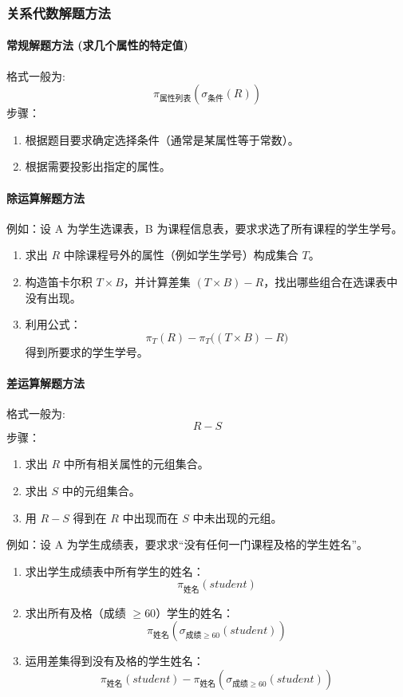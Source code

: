 \subsubsection{关系代数解题方法}

\paragraph{常规解题方法 (求几个属性的特定值)}
格式一般为:
\[
\pi_{\text{属性列表}}(\sigma_{\text{条件}}(R))
\]
步骤：
\begin{enumerate}
    \item 根据题目要求确定选择条件（通常是某属性等于常数）。
    \item 根据需要投影出指定的属性。
\end{enumerate}

\paragraph{除运算解题方法}
例如：设 A 为学生选课表，B 为课程信息表，要求求选了所有课程的学生学号。
\begin{enumerate}
    \item 求出 $R$ 中除课程号外的属性（例如学生学号）构成集合 $T$。
    \item 构造笛卡尔积 $T \times B$，并计算差集 $(T \times B) - R$，找出哪些组合在选课表中没有出现。
    \item 利用公式：
    \[
    \pi_T(R) - \pi_T\Big((T \times B) - R\Big)
    \]
    得到所要求的学生学号。
\end{enumerate}

\paragraph{差运算解题方法}
格式一般为:
\[
R - S
\]
步骤：
\begin{enumerate}
    \item 求出 $R$ 中所有相关属性的元组集合。
    \item 求出 $S$ 中的元组集合。
    \item 用 $R - S$ 得到在 $R$ 中出现而在 $S$ 中未出现的元组。
\end{enumerate}
例如：设 A 为学生成绩表，要求求“没有任何一门课程及格的学生姓名”。
\begin{enumerate}
    \item 求出学生成绩表中所有学生的姓名：
    \[
    \pi_{\text{姓名}}(student)
    \]
    \item 求出所有及格（成绩 $\geq 60$）学生的姓名：
    \[
    \pi_{\text{姓名}}(\sigma_{\text{成绩} \geq 60}(student))
    \]
    \item 运用差集得到没有及格的学生姓名：
    \[
    \pi_{\text{姓名}}(student) - \pi_{\text{姓名}}(\sigma_{\text{成绩} \geq 60}(student))
    \]
\end{enumerate}

